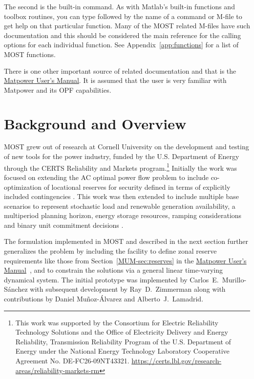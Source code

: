 \documentclass[12pt]{article}
\newcommand{\mpver}[0]{6.1-dev}
\newcommand{\matlab}[0]{{\sc Matlab}}
\newcommand{\matpower}[0]{{\sc Matpower}}
\newcommand{\most}[0]{{MOST}}
\newcommand{\code}[1]{{\relsize{-0.5}{\tt{{#1}}}}}  %
\newcommand{\mumurl}[0]{http://www.pserc.cornell.edu/matpower/docs/MATPOWER-manual-\mpver.pdf}
\newcommand{\mum}[0]{\href{\mumurl}{\matpower{} User's Manual}}
\numberwithin{equation}{section}
\numberwithin{table}{section}
\numberwithin{figure}{section}
\begin{document}
The second is the built-in \code{help} command. As with \matlab{}'s built-in functions and toolbox routines, you can type \code{help} followed by the name of a command or M-file to get help on that particular function. Many of the \most{} related M-files have such documentation and this should be considered the main reference for the calling options for each individual function. See Appendix~\ref{app:functions} for a list of \most{} functions.

There is one other important source of related documentation and that is the \mum{}. It is assumed that the user is very familiar with \matpower{} and its OPF capabilities.


\clearpage
\section{Background and Overview}

\most{} grew out of research at Cornell University on the development and testing of new tools for the power industry, funded by the U.S. Department of Energy through the CERTS Reliability and Markets program.\footnote{This work was supported by the Consortium for Electric Reliability Technology Solutions and the Office of Electricity Delivery and Energy Reliability, Transmission Reliability Program of the U.S. Department of Energy under the National Energy Technology Laboratory Cooperative Agreement No. DE-FC26-09NT43321. \url{https://certs.lbl.gov/research-areas/reliability-markets-rm}} Initially the work was focused on extending the AC optimal power flow problem to include co-optimization of locational reserves for security defined in terms of explicitly included contingencies \cite{superopf2008,murillo-sanchez2013}. This work was then extended to include multiple base scenarios to represent stochastic load and renewable generation availability, a multiperiod planning horizon, energy storage resources, ramping considerations and binary unit commitment decisions \cite{murillo-sanchez2013a}.

The formulation implemented in \most{} and described in the next section further generalizes the problem by including the facility to define zonal reserve requirements like those from Section~\ref{MUM-sec:reserves} in the \mum{}~\cite{matpower}, and to constrain the solutions via a general linear time-varying dynamical system. The initial prototype was implemented by Carlos~E.~Murillo-S\'anchez with subsequent development by Ray~D.~Zimmerman along with contributions by Daniel Mu\~noz-\'Alvarez and Alberto~J.~Lamadrid.
\end{document}

